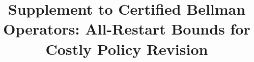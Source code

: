 
\usepackage{xr}

\begin{frontmatter}
\title{Supplement to Certified Bellman Operators: All-Restart Bounds for Costly Policy Revision}
\begin{aug}\author[id=au1,addressref={add1}]{~}\address[id=add1]{}\end{aug}
\end{frontmatter}


